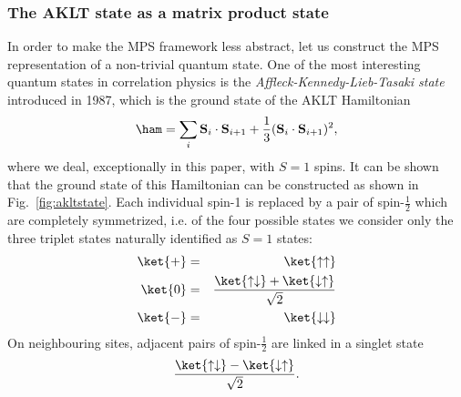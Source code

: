 \subsubsection{The AKLT state as a matrix product state} 
In order to make the MPS framework less abstract, let us construct the MPS representation of a non-trivial quantum state. One of the most interesting quantum states in correlation physics is the {\em Affleck-Kennedy-Lieb-Tasaki state} introduced in 1987, which is the ground state of  the AKLT Hamiltonian\cite{Affleck87,Affleck88}
\begin{equation}
\ham = \sum_{i} {\bf S}_i \cdot {\bf S}_{i+1} + 
\frac{1}{3} ({\bf S}_i \cdot {\bf S}_{i+1})^2 , 
\label{eq:aklt_hamiltonian}
\end{equation}
where we deal, exceptionally in this paper, with $S=1$ spins. It can be shown that the ground state of this Hamiltonian can be constructed as shown in Fig.~\ref{fig:akltstate}. Each individual spin-1 is replaced by a pair of spin-$\frac{1}{2}$ which are completely symmetrized, i.e. of the four possible states we consider only the three triplet states naturally identified as $S=1$ states:
\begin{eqnarray}
\ket{+}&=&\ket{\uparrow\uparrow} \nonumber \\
\ket{0}&=&\frac{\ket{\uparrow\downarrow}+\ket{\downarrow\uparrow}}{\sqrt{2}} 
\label{eq:tripletmapping} \\
\ket{-}&=&\ket{\downarrow\downarrow} \nonumber
\end{eqnarray}
On neighbouring sites, adjacent pairs of spin-$\frac{1}{2}$ are linked in a singlet state
\begin{equation}
\frac{\ket{\uparrow\downarrow}-\ket{\downarrow\uparrow}}{\sqrt{2}} .
\end{equation}

